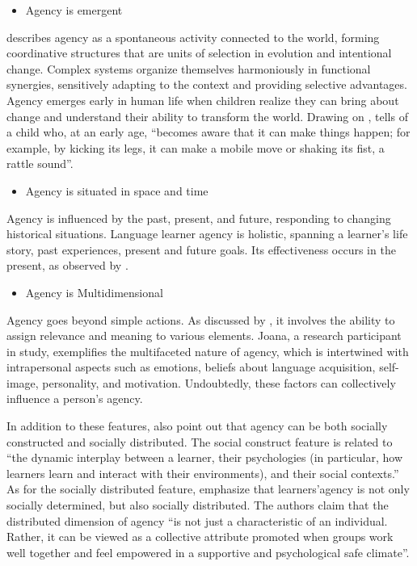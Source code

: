 \begin{itemize}
	\item Agency is emergent
\end{itemize}


\textcite{larsen2019} describes agency as a spontaneous activity connected to the world, forming coordinative structures that are units of selection in evolution and intentional change. Complex systems organize themselves harmoniously in functional synergies, sensitively adapting to the context and providing selective advantages. Agency emerges early in human life when children realize they can bring about change and understand their ability to transform the world. Drawing on \cite{kelso_self-organizing_2016}, \textcite[p. 65]{larsen2019} tells of a child who, at an early age, “becomes aware that it can make things happen; for example, by kicking its legs, it can make a mobile move or shaking its fist, a rattle sound”.

\begin{itemize}
	\item Agency is situated in space and time
\end{itemize}

Agency is influenced by the past, present, and future, responding to changing historical situations. Language learner agency is holistic, spanning a learner’s life story, past experiences, present and future goals. Its effectiveness occurs in the present, as observed by \textcite{biesta2007,mercer2012}.

\begin{itemize}
	\item Agency is Multidimensional
\end{itemize}

Agency goes beyond simple actions. As discussed by \textcite{lantolf2006,deters2015}, it involves the ability to assign relevance and meaning to various elements. Joana, a research participant in  study, exemplifies the multifaceted nature of agency, which is intertwined with intrapersonal aspects such as emotions, beliefs about language acquisition, self-image, personality, and motivation. Undoubtedly, these factors can collectively influence a person's agency.


In addition to these features,\textcite[p. 8]{mairitsch2023} also point out that agency can be both socially constructed and socially distributed. The social construct feature is related to “the dynamic interplay between a learner, their psychologies (in particular, how learners learn and interact with their environments), and their social contexts.” As for the socially distributed feature, \textcite[p. 5]{mairitsch2023} emphasize that learners’agency is not only socially determined, but also socially distributed. The authors \cite[p. 7]{mairitsch2023} claim that the distributed dimension of agency “is not just a characteristic of an individual. Rather, it can be viewed as a collective attribute promoted when groups work well together and feel empowered in a supportive and psychological safe climate”.


